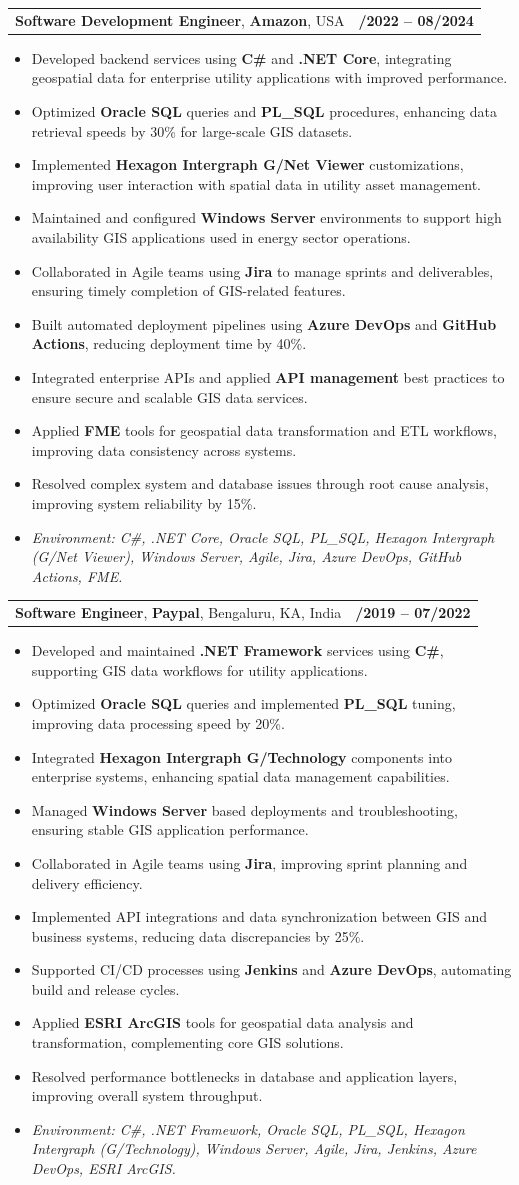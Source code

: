 \documentclass[letterpaper,11pt]{article}
\makeatletter
\newcommand{\resumeItem}[1]{
  \item\footnotesize{
    {#1 \vspace{-2pt}}
  }
}
\newcommand{\resumeSubheading}[4]{
  \vspace{-2pt}\item
    \begin{tabular*}{1.0\textwidth}[t]{l@{\extracolsep{\fill}}r}
      \textbf{\fontsize{10pt}{14pt}\selectfont #3}, \textbf{\fontsize{10pt}{14pt}\selectfont #1}, \fontsize{10pt}{14pt}\selectfont #4 & \textbf{\fontsize{10pt}{14pt}\selectfont #2} \\
    \end{tabular*}\vspace{-7pt}
}
\newcommand{\resumeItemListStart}{\begin{itemize}[leftmargin=*]}
\newcommand{\resumeItemListEnd}{\end{itemize}\vspace{-5pt}}
\makeatother
\begin{document}
\resumeSubheading
{Amazon}{10/2022 -- 08/2024}
{Software Development Engineer}{USA}
\resumeItemListStart
  \resumeItem{Developed backend services using \textbf{C\#} and \textbf{.NET Core}, integrating geospatial data for enterprise utility applications with improved performance.}
  \resumeItem{Optimized \textbf{Oracle SQL} queries and \textbf{PL\_SQL} procedures, enhancing data retrieval speeds by 30\% for large-scale GIS datasets.}
  \resumeItem{Implemented \textbf{Hexagon Intergraph G/Net Viewer} customizations, improving user interaction with spatial data in utility asset management.}
  \resumeItem{Maintained and configured \textbf{Windows Server} environments to support high availability GIS applications used in energy sector operations.}
  \resumeItem{Collaborated in Agile teams using \textbf{Jira} to manage sprints and deliverables, ensuring timely completion of GIS-related features.}
  \resumeItem{Built automated deployment pipelines using \textbf{Azure DevOps} and \textbf{GitHub Actions}, reducing deployment time by 40\%.}
  \resumeItem{Integrated enterprise APIs and applied \textbf{API management} best practices to ensure secure and scalable GIS data services.}
  \resumeItem{Applied \textbf{FME} tools for geospatial data transformation and ETL workflows, improving data consistency across systems.}
  \resumeItem{Resolved complex system and database issues through root cause analysis, improving system reliability by 15\%.}
  \resumeItem{\textit{Environment: C\#, .NET Core, Oracle SQL, PL\_SQL, Hexagon Intergraph (G/Net Viewer), Windows Server, Agile, Jira, Azure DevOps, GitHub Actions, FME.}}
\resumeItemListEnd

\resumeSubheading
{Paypal}{08/2019 -- 07/2022}
{Software Engineer}{Bengaluru, KA, India}
\resumeItemListStart
  \resumeItem{Developed and maintained \textbf{.NET Framework} services using \textbf{C\#}, supporting GIS data workflows for utility applications.}
  \resumeItem{Optimized \textbf{Oracle SQL} queries and implemented \textbf{PL\_SQL} tuning, improving data processing speed by 20\%.}
  \resumeItem{Integrated \textbf{Hexagon Intergraph G/Technology} components into enterprise systems, enhancing spatial data management capabilities.}
  \resumeItem{Managed \textbf{Windows Server} based deployments and troubleshooting, ensuring stable GIS application performance.}
  \resumeItem{Collaborated in Agile teams using \textbf{Jira}, improving sprint planning and delivery efficiency.}
  \resumeItem{Implemented API integrations and data synchronization between GIS and business systems, reducing data discrepancies by 25\%.}
  \resumeItem{Supported CI/CD processes using \textbf{Jenkins} and \textbf{Azure DevOps}, automating build and release cycles.}
  \resumeItem{Applied \textbf{ESRI ArcGIS} tools for geospatial data analysis and transformation, complementing core GIS solutions.}
  \resumeItem{Resolved performance bottlenecks in database and application layers, improving overall system throughput.}
  \resumeItem{\textit{Environment: C\#, .NET Framework, Oracle SQL, PL\_SQL, Hexagon Intergraph (G/Technology), Windows Server, Agile, Jira, Jenkins, Azure DevOps, ESRI ArcGIS.}}
\resumeItemListEnd
\end{document}
